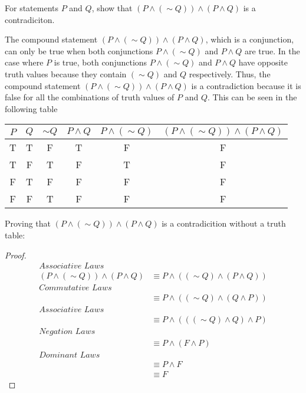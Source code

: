 \documentclass[12pt]{article}
\newenvironment{problem}[2][Problem]{\begin{trivlist}
		\item[\hskip \labelsep {\bfseries #1}\hskip \labelsep {\bfseries #2.}]}{\end{trivlist}}
\newenvironment{solution}[2][Solution]{\begin{trivlist}
		\item[\hskip \labelsep {\bfseries #1}\hskip \labelsep {\bfseries #2.}]}{\end{trivlist}}
\begin{document}
\begin{problem}{47}
	For statements $P$ and $Q$, show that $(P\wedge (\sim Q)) \wedge (P \wedge Q)$ is a contradiciton. 
	\begin{solution}{}
		The compound statement $(P\wedge (\sim Q)) \wedge (P \wedge Q)$, which is a conjunction, can only be true when both conjunctions $P\wedge (\sim Q)$ and $P \wedge Q$ are true. In the case where $P$ is true, both conjunctions $P\wedge (\sim Q)$ and $P \wedge Q$ have opposite truth values because they contain $(\sim Q)$ and $Q$ respectively. Thus, the compound statement $(P\wedge (\sim Q)) \wedge (P \wedge Q)$ is a contradiction because it is false for all the combinations of truth values of $P$ and $Q$.
		This can be seen in the following table
		\begin{center}
			\begin{tabular}{c c c c c c}
				$P$ & $Q$ & $\sim Q$ & $P \wedge Q$ & $P \wedge (\sim Q)$ & $(P\wedge (\sim Q)) \wedge (P \wedge Q)$\\
				\hline
				T & T & F & T & F& F \\
				T & F & T & F& T& F\\
				F & T & F & F& F& F\\
				F & F & T & F& F& F\\
				\hline
				
			\end{tabular}
		\end{center}
	 \noindent Proving that $(P\wedge (\sim Q)) \wedge (P \wedge Q)$ is a contradicition without a truth table:\\
	\begin{proof}
		\begin{align*}
			\textit{Associative Laws}\\
			(P\wedge (\sim Q)) \wedge (P \wedge Q) & \equiv P \wedge ((\sim Q)\wedge (P \wedge Q))\\
			\textit{Commutative Laws}\\
			& \equiv P \wedge ((\sim Q)\wedge (Q \wedge P))\\
			\textit{Associative Laws}\\
			& \equiv P \wedge (((\sim Q) \wedge Q) \wedge P)\\
			\textit{Negation Laws}\\
			& \equiv P \wedge (F \wedge P)\\
			\textit{Dominant Laws}\\
			& \equiv P \wedge F\\
			& \equiv F
		\end{align*}
	\end{proof}
	\end{solution}
\end{problem}
\end{document}

